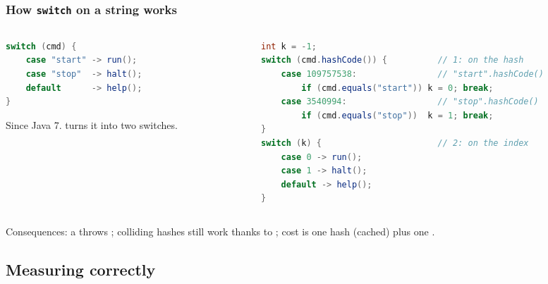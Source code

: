 \documentclass[aspectratio=169,10pt,compress]{beamer}
\begin{document}
\begin{frame}[t,fragile] \frametitle{How \texttt{switch} on a string works}
  \begin{columns}[T]
    \begin{column}{0.4\textwidth}


\begin{lstlisting}[style=codesnippet, language=Java]
switch (cmd) {
    case "start" -> run();
    case "stop"  -> halt();
    default      -> help();
}
\end{lstlisting}



      \small Since Java 7.  turns it into two switches.
    \end{column}
    \begin{column}{0.56\textwidth}


\begin{lstlisting}[style=codesnippet, language=Java, basicstyle=\ttfamily\scriptsize]
int k = -1;
switch (cmd.hashCode()) {          // 1: on the hash
    case 109757538:                // "start".hashCode()
        if (cmd.equals("start")) k = 0; break;
    case 3540994:                  // "stop".hashCode()
        if (cmd.equals("stop"))  k = 1; break;
}
switch (k) {                       // 2: on the index
    case 0 -> run();
    case 1 -> halt();
    default -> help();
}
\end{lstlisting}



    \end{column}
  \end{columns}
  \small Consequences: 
  a   throws ; 
  colliding hashes still work thanks to ;
  cost is one hash (cached) plus one .
\end{frame}


\subsection[Benchmark]{Measuring correctly}
\end{document}
